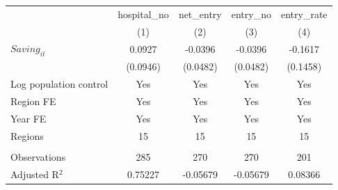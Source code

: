 \begingroup
\centering
\begin{tabular}{lcccc}
   \toprule
                          & hospital\_no  & net\_entry  & entry\_no  & entry\_rate \\    
                          & (1)           & (2)         & (3)        & (4)\\  
   \midrule 
   $Saving_{it}$          & 0.0927        & -0.0396     & -0.0396    & -0.1617\\   
                          & (0.0946)      & (0.0482)    & (0.0482)   & (0.1458)\\   
   Log population control & Yes           & Yes         & Yes        & Yes\\  
   Region FE              & Yes           & Yes         & Yes        & Yes\\  
   Year FE                & Yes           & Yes         & Yes        & Yes\\  
   Regions                & 15            & 15          & 15         & 15\\  
    \\
   Observations           & 285           & 270         & 270        & 201\\  
   Adjusted R$^2$         & 0.75227       & -0.05679    & -0.05679   & 0.08366\\  
   \bottomrule
\end{tabular}
\par\endgroup
